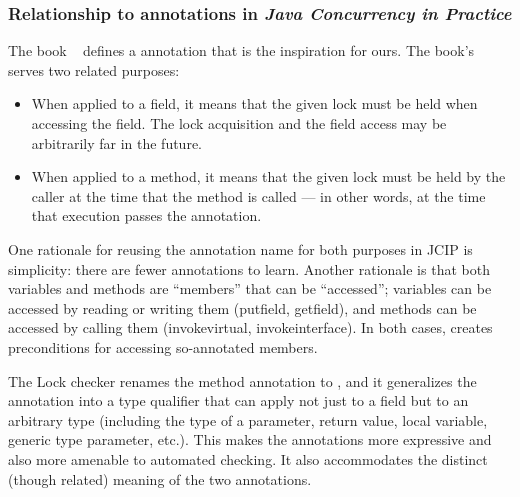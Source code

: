 \subsubsection{Relationship to annotations in \emph{Java Concurrency in Practice}\label{jcip-annotations}}

The book ~\cite{Goetz2006} defines a
 annotation that is the inspiration for ours.  The book's
 serves two related purposes:

\begin{itemize}
\item
  When applied to a field, it means that the given lock must be held when
  accessing the field.  The lock acquisition and the field access may be
  arbitrarily far in the future.
\item
  When applied to a method, it means that the given lock must be held by
  the caller at the time that the method is called --- in other words, at
  the time that execution passes the  annotation.
\end{itemize}

One rationale for reusing the annotation name for both purposes in JCIP is
simplicity:  there are fewer annotations to learn.  Another rationale is
that both variables and methods are ``members'' that can be ``accessed'';
variables can be accessed by reading or writing them (putfield, getfield),
and methods can be accessed by calling them (invokevirtual,
invokeinterface).  In both cases,
 creates preconditions for accessing so-annotated members.

The Lock checker renames the method annotation to
, and it generalizes the 
 annotation into a type qualifier
that can apply not just to a field but to an arbitrary type (including the
type of a parameter, return value, local variable, generic type parameter,
etc.).  This makes the annotations more expressive and also more amenable
to automated checking.  It also accommodates the distinct (though related)
meaning of the two annotations.




